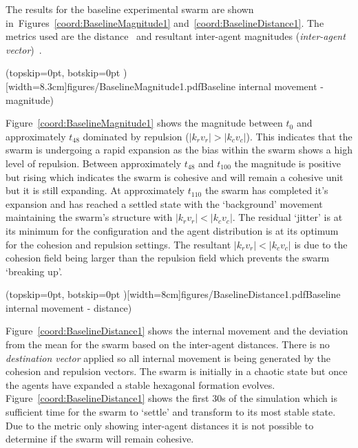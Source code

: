 \documentclass{ieeeaccess}
\begin{document}
The results for the baseline experimental swarm are shown in~Figures~\ref{coord:BaselineMagnitude1} and~\ref{coord:BaselineDistance1}. The metrics used are the distance~\cite{NIM:09} and resultant inter-agent magnitudes (\textit{inter-agent vector})~\cite{EKB:18}.


\Figure[t!](topskip=0pt, botskip=0pt )[width=8.3cm]{figures/BaselineMagnitude1.pdf}{Baseline internal movement - magnitude)\label{coord:BaselineMagnitude1}}

Figure~\ref{coord:BaselineMagnitude1} shows the magnitude between $t_0$ and approximately $t_{48}$ dominated by repulsion ($|k_rv_r| > |k_cv_c|$). This indicates that the swarm is undergoing a rapid expansion as the bias within the swarm shows a high level of repulsion. Between approximately $t_{48}$ and $t_{100}$ the magnitude is positive but rising which indicates the swarm is cohesive and will remain a cohesive unit but it is still expanding. At approximately $t_{110}$ the swarm has completed it's expansion and has reached a settled state with the `background' movement maintaining the swarm's structure with $|k_rv_r| < |k_cv_c|$. The residual `jitter' is at its minimum for the configuration and the agent distribution is at its optimum for the cohesion and repulsion settings. The resultant $|k_rv_r| < |k_cv_c|$ is due to the cohesion field being larger than the repulsion field which prevents the swarm `breaking up'. 


\Figure[t!](topskip=0pt, botskip=0pt )[width=8cm]{figures/BaselineDistance1.pdf}{Baseline internal movement - distance)\label{coord:BaselineDistance1}}

Figure~\ref{coord:BaselineDistance1} shows the internal movement and the deviation from the mean for the swarm based on the inter-agent distances. There is no \textit{destination vector} applied so all internal movement is being generated by the cohesion and repulsion vectors. The swarm is initially in a chaotic state but once the agents have expanded a stable hexagonal formation evolves. Figure~\ref{coord:BaselineDistance1} shows the first 30s of the simulation which is sufficient time for the swarm to `settle' and transform to its most stable state. Due to the metric only showing inter-agent distances it is not possible to determine if the swarm will remain cohesive.
\end{document}
